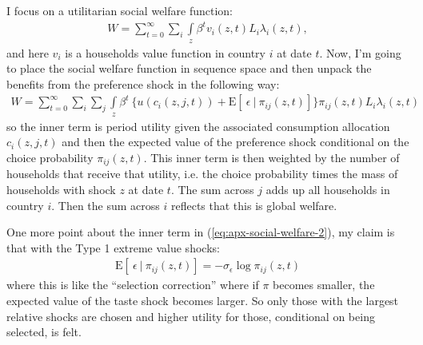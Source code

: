 \documentclass[12pt,pdftex]{article}
\begin{document}
\begin{onehalfspacing}
I focus on a utilitarian social welfare function:
\begin{align}
W = \sum_{t=0}^{\infty} \sum_{i}  \int\limits_{z} \beta^{t}  v_{i}(z,t) L_{i}\lambda_{i}(z,t),
\label{eq:apx-social-welfare}
\end{align}
and here $v_i$ is a households value function in country $i$ at date $t$. Now, I'm going to place the social welfare function in sequence space and then unpack the benefits from the preference shock in the following way:
\begin{align}
W = \sum_{t=0}^{\infty}  \sum_{i}  \sum_{j}  \int\limits_{z}  \beta^{t} \   \bigg \{  u(c_{i}(z, j, t) ) + \mathrm{E}[ \ \epsilon \ | \ \pi_{ij}(z,t) ] \bigg \}\pi_{ij}(z,t) L_{i} \lambda_{i}(z, t)
\label{eq:apx-social-welfare-2}
\end{align}
so the inner term is period utility given the associated consumption allocation $c_{i}(z, j, t)$ and then the expected value of the preference shock conditional on the choice probability $\pi_{ij}(z,t)$. This inner term is then weighted by the number of households that receive that utility, i.e. the choice probability times the mass of households with shock $z$ at date $t$. The sum across $j$ adds up all households in country $i$. Then the sum across $i$ reflects that this is global welfare.

One more point about the inner term in (\ref{eq:apx-social-welfare-2}), my claim is that with the Type 1 extreme value shocks:
\begin{align}
\mathrm{E}[ \ \epsilon \ | \ \pi_{ij}(z,t) ] = -\sigma_{\epsilon} \log \pi_{ij}(z,t)
\end{align}
where this is like the ``selection correction'' where if $\pi$ becomes smaller, the expected value of the taste shock becomes larger. So only those with the largest relative shocks are chosen and higher utility for those, conditional on being selected, is felt.


\end{onehalfspacing}
\end{document}
